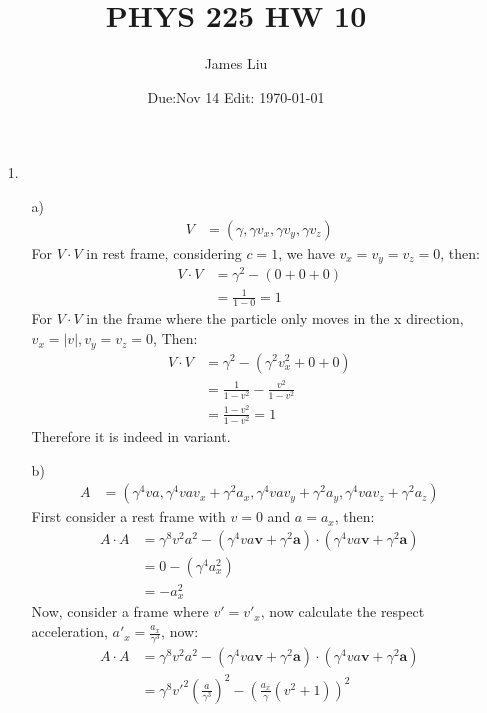\documentclass{article}
\date{Due:Nov 14 Edit: \today}
\title{PHYS 225 HW 10}
\author{James Liu}
\begin{document}
\maketitle
\begin{itemize}
    \item [1.]
    \begin{itemize}
        \item [a)]
        \begin{align*}
            V&=\left(\gamma,\gamma v_x,\gamma v_y, \gamma v_z\right)
        \end{align*}
        For \(V\cdot V\) in rest frame, considering \(c=1\), we have \(v_x=v_y=v_z=0\), then:
        \begin{align*}
            V\cdot V &=\gamma^2-(0+0+0)\\
            &=\frac{1}{1-0}=1
        \end{align*} 
        For \(V\cdot V\) in the frame where the particle only moves in the x direction, \(v_x=|v|,v_y=v_z=0\), Then:
        \begin{align*}
            V\cdot V&=\gamma^2-(\gamma^2v_x^2+0+0)\\
            &=\frac{1}{1-v^2}-\frac{v^2}{1-v^2}\\
            &=\frac{1-v^2}{1-v^2}=1
        \end{align*}
        Therefore it is indeed in variant.
        \item [b)]
        \begin{align*}
            A&=\left(\gamma^4va,\gamma^4vav_x+\gamma^2a_x,\gamma^4vav_y+\gamma^2a_y,\gamma^4vav_z+\gamma^2a_z\right)
        \end{align*}
        First consider a rest frame with \(v=0\) and \(a=a_x\), then:
        \begin{align*}
            A\cdot A &=\gamma^8v^2a^2-(\gamma^4va\mathbf{v}+\gamma^2\mathbf{a})\cdot (\gamma^4va\mathbf{v}+\gamma^2\mathbf{a})\\
            &=0-(\gamma^4a_x^2)\\
            &=-a^2_x
        \end{align*}
        Now, consider a frame where \(v'=v'_x\), now calculate the respect acceleration, \(a'_x =\frac{a_x}{\gamma^3}\), now:
        \begin{align*}
            A\cdot A &=\gamma^8v^2a^2-(\gamma^4va\mathbf{v}+\gamma^2\mathbf{a})\cdot (\gamma^4va\mathbf{v}+\gamma^2\mathbf{a})\\
            &=\gamma^8v'^2\left(\frac{a}{\gamma^3}\right)^2-\left(\frac{a_x}{\gamma}\left(v^2+1\right)\right)^2\\

\end{align*}
\end{itemize}
\end{itemize}
\end{document}

